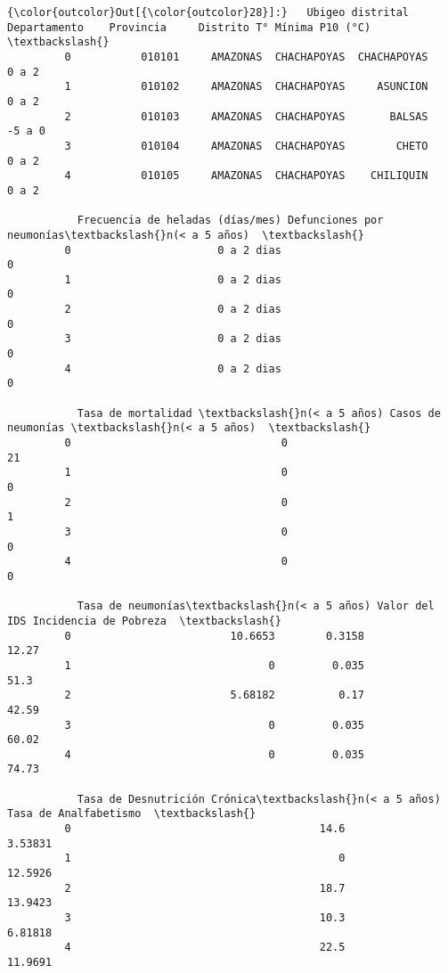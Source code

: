 \documentclass[11pt]{article}
\begin{document}
\begin{Verbatim}[commandchars=\\\{\}]
{\color{outcolor}Out[{\color{outcolor}28}]:}   Ubigeo distrital Departamento    Provincia     Distrito T° Mínima P10 (°C)  \textbackslash{}
         0           010101     AMAZONAS  CHACHAPOYAS  CHACHAPOYAS              0 a 2   
         1           010102     AMAZONAS  CHACHAPOYAS     ASUNCION              0 a 2   
         2           010103     AMAZONAS  CHACHAPOYAS       BALSAS             -5 a 0   
         3           010104     AMAZONAS  CHACHAPOYAS        CHETO              0 a 2   
         4           010105     AMAZONAS  CHACHAPOYAS    CHILIQUIN              0 a 2   
         
           Frecuencia de heladas (días/mes) Defunciones por neumonías\textbackslash{}n(< a 5 años)  \textbackslash{}
         0                       0 a 2 dias                                       0   
         1                       0 a 2 dias                                       0   
         2                       0 a 2 dias                                       0   
         3                       0 a 2 dias                                       0   
         4                       0 a 2 dias                                       0   
         
           Tasa de mortalidad \textbackslash{}n(< a 5 años) Casos de neumonías \textbackslash{}n(< a 5 años)  \textbackslash{}
         0                                 0                                21   
         1                                 0                                 0   
         2                                 0                                 1   
         3                                 0                                 0   
         4                                 0                                 0   
         
           Tasa de neumonías\textbackslash{}n(< a 5 años) Valor del IDS Incidencia de Pobreza  \textbackslash{}
         0                         10.6653        0.3158                 12.27   
         1                               0         0.035                  51.3   
         2                         5.68182          0.17                 42.59   
         3                               0         0.035                 60.02   
         4                               0         0.035                 74.73   
         
           Tasa de Desnutrición Crónica\textbackslash{}n(< a 5 años) Tasa de Analfabetismo  \textbackslash{}
         0                                       14.6               3.53831   
         1                                          0               12.5926   
         2                                       18.7               13.9423   
         3                                       10.3               6.81818   
         4                                       22.5               11.9691   
         

\end{Verbatim}
\end{document}
